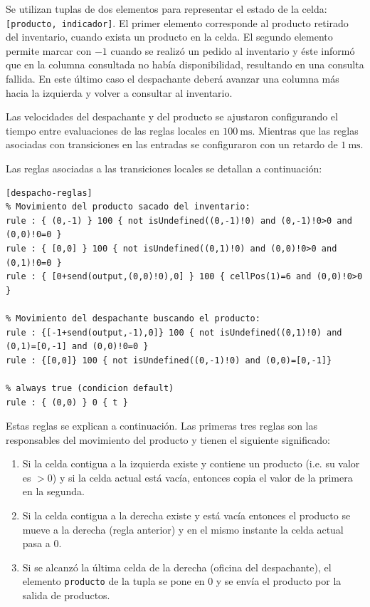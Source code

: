 \documentclass[10pt]{article}
\begin{document}
Se utilizan tuplas de dos elementos para representar el estado de la celda: \texttt{[producto, indicador]}. El primer elemento corresponde al producto retirado del inventario, cuando exista un producto en la celda. El segundo elemento permite marcar con $-1$ cuando se realizó un pedido al inventario y éste informó que en la columna consultada no había disponibilidad, resultando en una consulta fallida. En este último caso el despachante deberá avanzar una columna más hacia la izquierda y volver a consultar al inventario.

Las velocidades del despachante y del producto se ajustaron configurando el tiempo entre evaluaciones de las reglas locales en $100~\textrm{ms}$. Mientras que las reglas asociadas con transiciones en las entradas se configuraron con un retardo de $1~\textrm{ms}$.

Las reglas asociadas a las transiciones locales se detallan a continuación:

\begin{minipage}{1\textwidth}
	\centering
	\begin{lstlisting}
[despacho-reglas]
% Movimiento del producto sacado del inventario:
rule : { (0,-1) } 100 { not isUndefined((0,-1)!0) and (0,-1)!0>0 and (0,0)!0=0 }
rule : { [0,0] } 100 { not isUndefined((0,1)!0) and (0,0)!0>0 and (0,1)!0=0 }
rule : { [0+send(output,(0,0)!0),0] } 100 { cellPos(1)=6 and (0,0)!0>0 }

% Movimiento del despachante buscando el producto:
rule : {[-1+send(output,-1),0]} 100 { not isUndefined((0,1)!0) and (0,1)=[0,-1] and (0,0)!0=0 }
rule : {[0,0]} 100 { not isUndefined((0,-1)!0) and (0,0)=[0,-1]}

% always true (condicion default)
rule : { (0,0) } 0 { t }
	\end{lstlisting}
\end{minipage}

Estas reglas se explican a continuación. Las primeras tres reglas son las responsables del movimiento del producto y tienen el siguiente significado:
\begin{enumerate}
	\item Si la celda contigua a la izquierda existe y contiene un producto (i.e. su valor es $>0$) y si la celda actual está vacía, entonces copia el valor de la primera en la segunda. 
	\item Si la celda contigua a la derecha existe y está vacía entonces el producto se mueve a la derecha (regla anterior) y en el mismo instante la celda actual pasa a $0$.
	\item Si se alcanzó la última celda de la derecha (oficina del despachante), el elemento \texttt{producto} de la tupla se pone en $0$ y se envía el producto por la salida de productos.
\end{enumerate}
\end{document}
